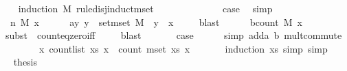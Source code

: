 \begin{isabellebody}
\ \ \isamarkupfalse%
\ {\isacharparenleft}{\kern0pt}induction\ {\isachardoublequoteopen}M{\isachardoublequoteclose}\ rule{\isacharcolon}{\kern0pt}disj{\isacharunderscore}{\kern0pt}induct{\isacharunderscore}{\kern0pt}mset{\isacharparenright}{\kern0pt}\isanewline
\ \ \ \ \isamarkupfalse%
\ {}\isanewline
\ \ \ \ \isamarkupfalse%
\ \isamarkupfalse%
\ {\isacharquery}{\kern0pt}case\ \isamarkupfalse%
\ simp\isanewline
\ \ \isamarkupfalse%
\isanewline
\ \ \ \ \isamarkupfalse%
\ {\isacharparenleft}{\kern0pt}{}\ n\ M\ x{\isacharparenright}{\kern0pt}\isanewline
\ \ \ \ \isamarkupfalse%
\ a{\isacharcolon}{\kern0pt}{\isachardoublequoteopen}{\isasymAnd}y{\isachardot}{\kern0pt}\ y\ {\isasymin}\ set{\isacharunderscore}{\kern0pt}mset\ M\ {\isasymLongrightarrow}\ y\ {\isasymnoteq}\ x{\isachardoublequoteclose}\ \isamarkupfalse%
\ {}{\isacharparenleft}{\kern0pt}{}{\isacharparenright}{\kern0pt}\ \isamarkupfalse%
\ blast\isanewline
\ \ \ \ \isamarkupfalse%
\ b{\isacharcolon}{\kern0pt}{\isachardoublequoteopen}count\ M\ x\ {\isacharequal}{\kern0pt}\ {}{\isachardoublequoteclose}\ \isamarkupfalse%
\ {\isacharparenleft}{\kern0pt}subst\ \ count{\isacharunderscore}{\kern0pt}eq{\isacharunderscore}{\kern0pt}zero{\isacharunderscore}{\kern0pt}iff{\isacharparenright}{\kern0pt}\ \isamarkupfalse%
\ {}\ \isamarkupfalse%
\ blast\ \isanewline
\ \ \ \ \isamarkupfalse%
\ {\isacharquery}{\kern0pt}case\ \isamarkupfalse%
\ {}\ \ \isamarkupfalse%
\ {\isacharparenleft}{\kern0pt}simp\ add{\isacharcolon}{\kern0pt}a\ b\ mult{\isachardot}{\kern0pt}commute{\isacharparenright}{\kern0pt}\isanewline
\ \ \isamarkupfalse%
\isanewline
\ \ \isamarkupfalse%
\ \isamarkupfalse%
\ {\isachardoublequoteopen}{\isasymAnd}x{\isachardot}{\kern0pt}\ count{\isacharunderscore}{\kern0pt}list\ xs\ x\ {\isacharequal}{\kern0pt}\ count\ {\isacharparenleft}{\kern0pt}mset\ xs{\isacharparenright}{\kern0pt}\ x{\isachardoublequoteclose}\ \isanewline
\ \ \ \ \isamarkupfalse%
\ {\isacharparenleft}{\kern0pt}induction\ xs{\isacharcomma}{\kern0pt}\ simp{\isacharcomma}{\kern0pt}\ simp{\isacharparenright}{\kern0pt}\isanewline
\ \ \isamarkupfalse%
\ \isamarkupfalse%
\ {\isacharquery}{\kern0pt}thesis\isanewline

\end{isabellebody}
